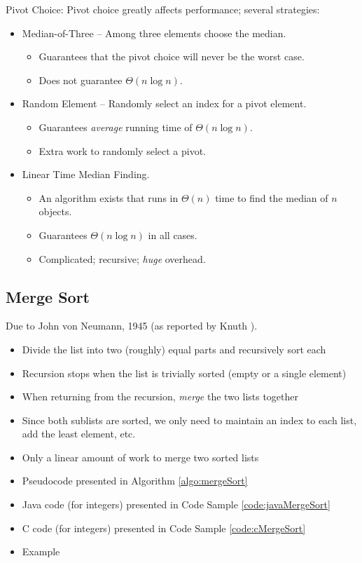 Pivot Choice: Pivot choice greatly affects performance; several strategies:
\begin{itemize}
  \item Median-of-Three -- Among three elements choose the median.
        \begin{itemize}
         \item Guarantees that the pivot choice will never be the
               worst case.
         \item Does not guarantee $\Theta(n\log{n})$.
        \end{itemize}
  \item Random Element -- Randomly select an index for a pivot element.
        \begin{itemize}
         \item Guarantees \emph{average} running time of $\Theta(n\log{n})$.
         \item Extra work to randomly select a pivot.
        \end{itemize}
  \item Linear Time Median Finding.
        \begin{itemize}
         \item An algorithm exists that runs in $\Theta(n)$ time to
               find the median of $n$ objects.
         \item Guarantees $\Theta(n\log{n})$ in all cases.
         \item Complicated; recursive; \emph{huge} overhead.
        \end{itemize}
\end{itemize}

\subsection{Merge Sort}

Due to John von Neumann, 1945 (as reported by Knuth \cite{Knuth:1970:VNF:356580.356581}).

\begin{itemize}
  \item Divide the list into two (roughly) equal parts and recursively sort each
  \item Recursion stops when the list is trivially sorted (empty or a single element)
  \item When returning from the recursion, \emph{merge} the two lists together
  \item Since both sublists are sorted, we only need to maintain an index to each list, add the least element, etc.
  \item Only a linear amount of work to merge two sorted lists
  \item Pseudocode presented in Algorithm \ref{algo:mergeSort}
  \item Java code (for integers) presented in Code Sample \ref{code:javaMergeSort}
  \item C code (for integers) presented in Code Sample \ref{code:cMergeSort}
  \item Example
\end{itemize}

